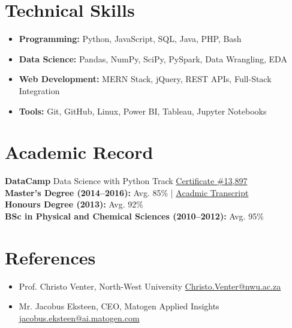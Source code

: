 \documentclass[a4paper,10pt]{article}
\begin{document}
\section*{Technical Skills}
\begin{itemize}
	\item \textbf{Programming:} Python, JavaScript, SQL, Java, PHP, Bash
	\item \textbf{Data Science:} Pandas, NumPy, SciPy, PySpark, Data Wrangling, EDA
	\item \textbf{Web Development:} MERN Stack, jQuery, REST APIs, Full-Stack Integration
	\item \textbf{Tools:} Git, GitHub, Linux, Power BI, Tableau, Jupyter Notebooks
\end{itemize}

\section*{Academic Record}
\textbf{DataCamp} Data Science with Python Track \href{https://github.com/HenriBranken/Henri_Branken_Certification/blob/master/online_courses/datacamp_dot_com/datacamp_Data_Scientist_with_Python_Track.pdf}{Certificate {\#}13,897} \\
\textbf{Master’s Degree (2014--2016):} Avg. 85\% | \href{https://github.com/HenriBranken/Henri_Branken_Certification/blob/master/tertiary/full_university_academic_record.pdf}{Acadmic Transcript} \\
\textbf{Honours Degree (2013):} Avg. 92\% \\
\textbf{BSc in Physical and Chemical Sciences (2010--2012):} Avg. 95\%

\section*{References}
\begin{itemize}
	\item Prof. Christo Venter, North-West University \href{mailto:Christo.Venter@nwu.ac.za}{Christo.Venter@nwu.ac.za}
	\item Mr. Jacobus Eksteen, CEO, Matogen Applied Insights \href{mailto:jacobus.eksteen@ai.matogen.com}{jacobus.eksteen@ai.matogen.com}
\end{itemize}
	
\end{document}
